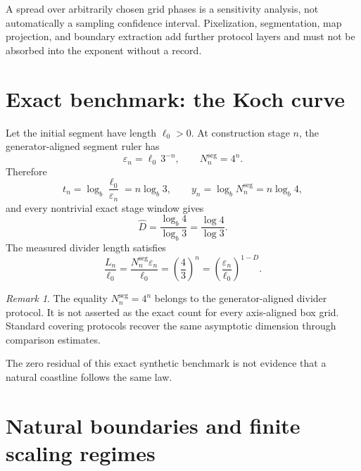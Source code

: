 \documentclass[11pt,a4paper]{article}
\theoremstyle{definition}
\theoremstyle{plain}
\theoremstyle{remark}
\newtheorem{remark}[definition]{Remark}
\newcommand{\Wcal}{\mathcal{W}}
\begin{document}
A spread over arbitrarily chosen grid phases is a sensitivity analysis,
not automatically a sampling confidence interval. Pixelization,
segmentation, map projection, and boundary extraction add further
protocol layers and must not be absorbed into the exponent without a
record.

\section{Exact benchmark: the Koch curve}

Let the initial segment have length $\ell_0>0$. At construction stage
$n$, the generator-aligned segment ruler has
\[
\varepsilon_n=\ell_0\,3^{-n},
\qquad
N_n^{\mathrm{seg}}=4^n.
\]
Therefore
\[
t_n=\log_b\frac{\ell_0}{\varepsilon_n}
=n\log_b3,
\qquad
y_n=\log_bN_n^{\mathrm{seg}}
=n\log_b4,
\]
and every nontrivial exact stage window gives
\[
\widehat D
=
\frac{\log_b4}{\log_b3}
=
\frac{\log4}{\log3}.
\]
The measured divider length satisfies
\[
\frac{L_n}{\ell_0}
=
\frac{N_n^{\mathrm{seg}}\varepsilon_n}{\ell_0}
=
\left(\frac43\right)^n
=
\left(\frac{\varepsilon_n}{\ell_0}\right)^{1-D}.
\]

\begin{center}
\end{center}

\begin{remark}
The equality $N_n^{\mathrm{seg}}=4^n$ belongs to the
generator-aligned divider protocol. It is not asserted as the exact count
for every axis-aligned box grid. Standard covering protocols recover the
same asymptotic dimension through comparison estimates.
\end{remark}

The zero residual of this exact synthetic benchmark is not evidence that
a natural coastline follows the same law.

\section{Natural boundaries and finite scaling regimes}
\end{document}
